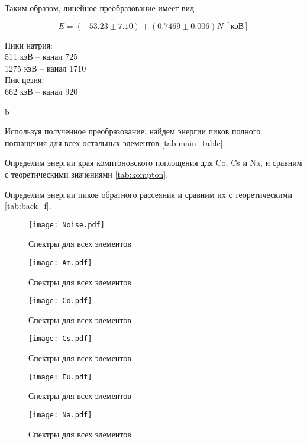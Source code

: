 	Таким образом, линейное преобразование имеет вид

	\[ E = (-53.23 \pm 7.10) + (0.7469 \pm 0.006) N ~ [\text{кэВ}] \]

	\begin{center}
		Пики натрия: \\
		511 кэВ -- канал 725 \\
		1275 кэВ -- канал 1710 \\[1 cm]
		Пик цезия: \\
		662 кэВ -- канал 920
	\end{center}b


	Используя полученное преобразование, найдем энергии пиков полного поглащения для всех остальных
	элементов \ref{tab:main_table}.

	

    Определим энергии края комптоновского поглощения для Co, Cs и Na, и сравним с теоретическими значениями \ref{tab:kompton}.

    

    Определим энергии пиков обратного рассеяния и сравним их с теоретическими \ref{tab:back_f}.

    

	\begin{figure}
		\centering
		\texttt{[image: Noise.pdf]}
		\caption{Спектры для всех элементов}
		\label{fig:Noise}
	\end{figure}

	\begin{figure}
		\centering
		\texttt{[image: Am.pdf]}
		\caption{Спектры для всех элементов}
		\label{fig:Am}
	\end{figure}

	\begin{figure}
		\centering
		\texttt{[image: Co.pdf]}
		\caption{Спектры для всех элементов}
		\label{fig:Co}
	\end{figure}

	\begin{figure}
		\centering
		\texttt{[image: Cs.pdf]}
		\caption{Спектры для всех элементов}
		\label{fig:Cs}
	\end{figure}

	\begin{figure}
		\centering
		\texttt{[image: Eu.pdf]}
		\caption{Спектры для всех элементов}
		\label{fig:Eu}
	\end{figure}

	\begin{figure}
		\centering
		\texttt{[image: Na.pdf]}
		\caption{Спектры для всех элементов}
		\label{fig:Na}
	\end{figure}

